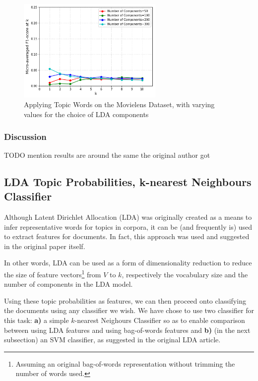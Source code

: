 \begin{figure}[H]
    \centering
    \includegraphics[width=7cm]{chapters/05_experiments/images/movielens-topic-words.png}
    \caption{Applying Topic Words on the Movielens Dataset, with varying values for the choice of LDA components}
    \label{fig:ovr_svm_movielens}
\end{figure}

\subsubsection{Discussion}

{\color{red} TODO mention results are around the same the original author got}

\subsection{LDA Topic Probabilities, k-nearest Neighbours Classifier}

Although Latent Dirichlet Allocation (LDA) \citep{blei_etal_2003} was originally created as a means to infer representative words for topics in corpora, it can be (and frequently is) used to extract features for documents. In fact, this approach was used and suggested in the original paper itself.

In other words, LDA can be used as a form of dimensionality reduction to reduce the size of feature vectors\footnote{Assuming an original bag-of-words representation without trimming the number of words used.} from $V$ to $k$, respectively the vocabulary size and the number of components in the LDA model.

Using these topic probabilities as features, we can then proceed onto classifying the documents using any classifier we wish. We have chose to use two classifier for this task: \textbf{a)} a simple $k$-nearest Neighours Classifier so as to enable comparison between using LDA features and using bag-of-words features and \textbf{b)} (in the next subsection) an SVM classifier, as suggested in the original LDA article.

